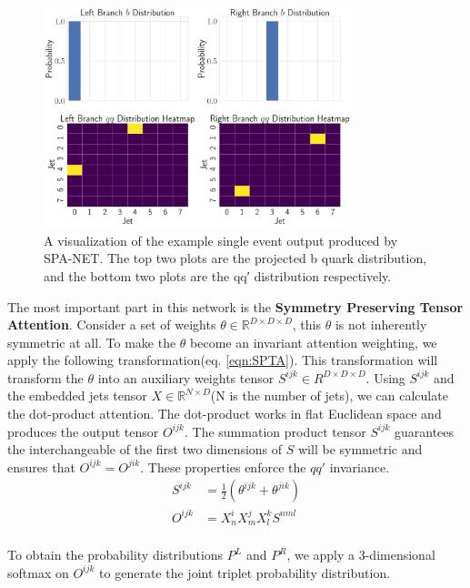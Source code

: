 \begin{figure}[H]
	\centering
	\includegraphics[width=0.8\textwidth]{Figures/typical_output.pdf}
	\caption{A visualization of the example single event output produced by SPA-NET. The top two plots are the projected b quark distribution, and the bottom two plots are the qq′ distribution respectively. }
	\label{fig:output}
\end{figure}
The most important part in this network is the \textbf{Symmetry Preserving Tensor Attention}. Consider a set of weights $\theta \in \mathbb{R}^{D\times D\times D}$, this $\theta$ is not inherently symmetric at all. To make the $\theta$ become an invariant attention weighting, we apply the following transformation(eq. \ref{eqn:SPTA}). This transformation will transform the $\theta$ into an auxiliary weights tensor $S^{ijk}\in R^{D\times D\times D}$. Using $S^{ijk}$ and the embedded jets tensor $X \in \mathbb{R}^{N\times D}$(N is the number of jets), we can calculate the dot-product attention. The dot-product works in flat Euclidean space and produces the output tensor $O^{ijk}$. The summation product tensor $S^{ijk}$ guarantees the interchangeable of the first two dimensions of $S$ will be symmetric and ensures that $O^{ijk}=O^{jik}$. These properties enforce the $qq'$ invariance.
\\
\begin{equation}\label{eqn:SPTA}
	\begin{split}
	S^{ijk} &= \frac{1}{2}\left( \theta^{ijk} + \theta^{jik}\right) \\
	O^{ijk} &= X^{i}_{n}X^{j}_{m}X^{k}_{l}S^{nml}
		\end{split}
\end{equation}
\\
To obtain the probability distributions $P^{L}$ and $P^{R}$, we apply a 3-dimensional softmax on $O^{ijk}$ to generate the joint triplet probability distribution.
